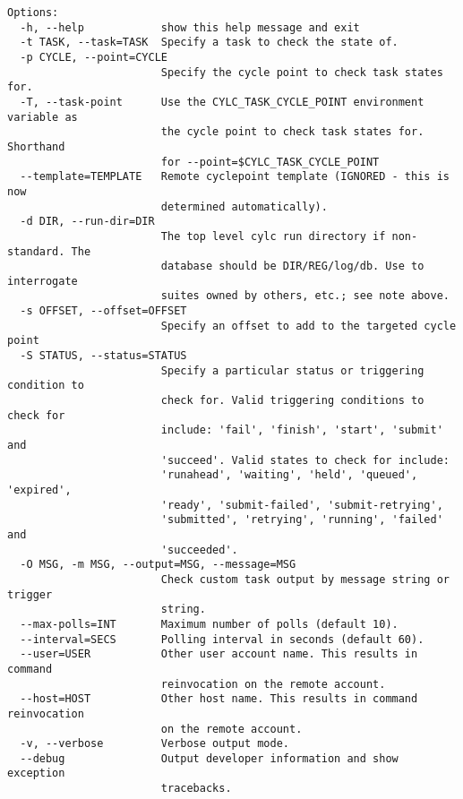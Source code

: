 \begin{lstlisting}
Options:
  -h, --help            show this help message and exit
  -t TASK, --task=TASK  Specify a task to check the state of.
  -p CYCLE, --point=CYCLE
                        Specify the cycle point to check task states for.
  -T, --task-point      Use the CYLC_TASK_CYCLE_POINT environment variable as
                        the cycle point to check task states for. Shorthand
                        for --point=$CYLC_TASK_CYCLE_POINT
  --template=TEMPLATE   Remote cyclepoint template (IGNORED - this is now
                        determined automatically).
  -d DIR, --run-dir=DIR
                        The top level cylc run directory if non-standard. The
                        database should be DIR/REG/log/db. Use to interrogate
                        suites owned by others, etc.; see note above.
  -s OFFSET, --offset=OFFSET
                        Specify an offset to add to the targeted cycle point
  -S STATUS, --status=STATUS
                        Specify a particular status or triggering condition to
                        check for. Valid triggering conditions to check for
                        include: 'fail', 'finish', 'start', 'submit' and
                        'succeed'. Valid states to check for include:
                        'runahead', 'waiting', 'held', 'queued', 'expired',
                        'ready', 'submit-failed', 'submit-retrying',
                        'submitted', 'retrying', 'running', 'failed' and
                        'succeeded'.
  -O MSG, -m MSG, --output=MSG, --message=MSG
                        Check custom task output by message string or trigger
                        string.
  --max-polls=INT       Maximum number of polls (default 10).
  --interval=SECS       Polling interval in seconds (default 60).
  --user=USER           Other user account name. This results in command
                        reinvocation on the remote account.
  --host=HOST           Other host name. This results in command reinvocation
                        on the remote account.
  -v, --verbose         Verbose output mode.
  --debug               Output developer information and show exception
                        tracebacks.
\end{lstlisting}
